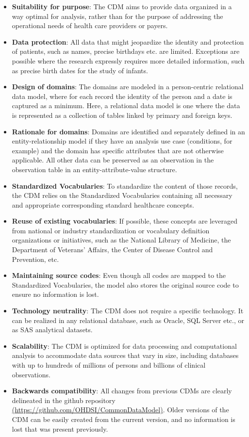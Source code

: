 \documentclass[11pt]{book}
\providecommand{\tightlist}{%
  \setlength{\itemsep}{0pt}\setlength{\parskip}{0pt}}
\theoremstyle{definition}
\theoremstyle{definition}
\theoremstyle{definition}
\theoremstyle{remark}
\begin{document}
\begin{itemize}
\tightlist
\item
  \textbf{Suitability for purpose}: The CDM aims to provide data organized in a way optimal for analysis, rather than for the purpose of addressing the operational needs of health care providers or payers.
\item
  \textbf{Data protection}: All data that might jeopardize the identity and protection of patients, such as names, precise birthdays etc. are limited. Exceptions are possible where the research expressly requires more detailed information, such as precise birth dates for the study of infants.
\item
  \textbf{Design of domains}: The domains are modeled in a person-centric relational data model, where for each record the identity of the person and a date is captured as a minimum. Here, a relational data model is one where the data is represented as a collection of tables linked by primary and foreign keys.
\item
  \textbf{Rationale for domains}: Domains are identified and separately defined in an entity-relationship model if they have an analysis use case (conditions, for example) and the domain has specific attributes that are not otherwise applicable. All other data can be preserved as an observation in the observation table in an entity-attribute-value structure.
\item
  \textbf{Standardized Vocabularies}: To standardize the content of those records, the CDM relies on the Standardized Vocabularies containing all necessary and appropriate corresponding standard healthcare concepts.
\item
  \textbf{Reuse of existing vocabularies}: If possible, these concepts are leveraged from national or industry standardization or vocabulary definition organizations or initiatives, such as the National Library of Medicine, the Department of Veterans' Affairs, the Center of Disease Control and Prevention, etc.
\item
  \textbf{Maintaining source codes}: Even though all codes are mapped to the Standardized Vocabularies, the model also stores the original source code to ensure no information is lost.
\item
  \textbf{Technology neutrality}: The CDM does not require a specific technology. It can be realized in any relational database, such as Oracle, SQL Server etc., or as SAS analytical datasets.
\item
  \textbf{Scalability}: The CDM is optimized for data processing and computational analysis to accommodate data sources that vary in size, including databases with up to hundreds of millions of persons and billions of clinical observations.
\item
  \textbf{Backwards compatibility}: All changes from previous CDMs are clearly delineated in the github repository \href{https://github.com/OHDSI/CommonDataModel}{(https://github.com/OHDSI/CommonDataModel)}. Older versions of the CDM can be easily created from the current version, and no information is lost that was present previously.
\end{itemize}
\end{document}
